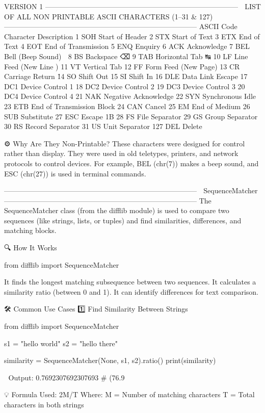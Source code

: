 VERSION 1
---------------------------------------------------------------------------------
🔢 LIST OF ALL NON PRINTABLE ASCII CHARACTERS (1–31 & 127)
---------------------------------------------------------------------------------
ASCII Code	Character	Description
1	SOH	Start of Header
2	STX	Start of Text
3	ETX	End of Text
4	EOT	End of Transmission
5	ENQ	Enquiry
6	ACK	Acknowledge
7	BEL	Bell (Beep Sound) 🔔
8	BS	Backspace ⌫
9	TAB	Horizontal Tab ↹
10	LF	Line Feed (New Line \n)
11	VT	Vertical Tab
12	FF	Form Feed (New Page)
13	CR	Carriage Return \r
14	SO	Shift Out
15	SI	Shift In
16	DLE	Data Link Escape
17	DC1	Device Control 1
18	DC2	Device Control 2
19	DC3	Device Control 3
20	DC4	Device Control 4
21	NAK	Negative Acknowledge
22	SYN	Synchronous Idle
23	ETB	End of Transmission Block
24	CAN	Cancel
25	EM	End of Medium
26	SUB	Substitute
27	ESC	Escape \x1B
28	FS	File Separator
29	GS	Group Separator
30	RS	Record Separator
31	US	Unit Separator
127	DEL	Delete

⚙️ Why Are They Non-Printable?
These characters were designed for control rather than display.
They were used in old teletypes, printers, and network protocols to control devices.
For example, BEL (chr(7)) makes a beep sound, and ESC (chr(27)) is used in terminal commands.

---------------------------------------------------------------------------------
📌 SequenceMatcher
---------------------------------------------------------------------------------
The SequenceMatcher class (from the difflib module) is used to compare two sequences (like strings, lists, or tuples) and find similarities, 
differences, and matching blocks.

🔍 How It Works

from difflib import SequenceMatcher

It finds the longest matching subsequence between two sequences.
It calculates a similarity ratio (between 0 and 1).
It can identify differences for text comparison.

🛠 Common Use Cases
1️⃣ Find Similarity Between Strings

from difflib import SequenceMatcher

s1 = "hello world"
s2 = "hello there"

similarity = SequenceMatcher(None, s1, s2).ratio()
print(similarity)

🔹 Output:
0.7692307692307693  # (76.9%

💡 Formula Used:
2M/T
Where:
M = Number of matching characters
T = Total characters in both strings

